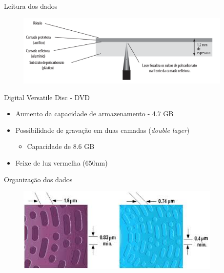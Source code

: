 \documentclass[aspectratio=169,
				xcolor=table]{beamer}
\begin{document}
	\begin{frame}{Leitura dos dados}
		\begin{figure}[hbtp]
		\centering
		\includegraphics[width=0.95\textwidth, keepaspectratio]{../figs/cap08/cd1}
		\end{figure}		
	\end{frame}
		
	\begin{frame}{Digital Versatile Disc - DVD}
		\begin{itemize}
			\item Aumento da capacidade de armazenamento - 4.7 GB
			\vspace{1em}
			\item Possibilidade de gravação em duas camadas (\textit{double layer})
			\begin{itemize}
				\item Capacidade de 8.6 GB
			\end{itemize}
			\vspace{1em}
			\item Feixe de luz vermelha (650nm)
		\end{itemize}
	\end{frame}
	
	\begin{frame}{Organização dos dados}
		\begin{figure}[hbtp]
			\centering
			\includegraphics[width=0.9\textwidth, keepaspectratio]{../figs/cap08/cddvd}
		\end{figure}			
	\end{frame}
	
\end{document}
